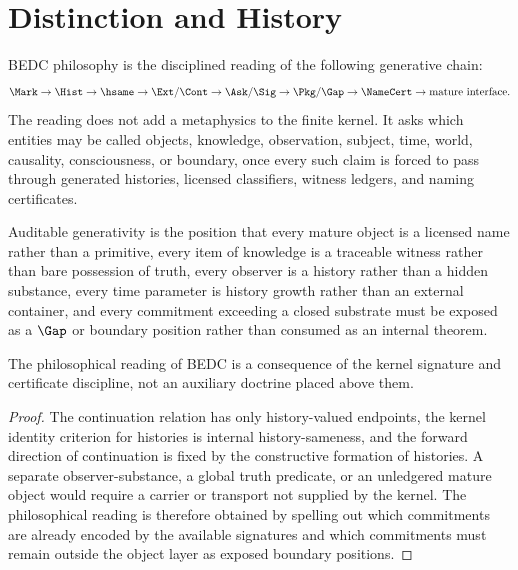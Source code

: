 \section{Distinction and History}
\label{sec:visions-philosophy-distinction-and-history}

BEDC philosophy is the disciplined reading of the following generative
chain:
$$
\begin{gathered}
\Mark \to \Hist \to \hsame \to \Ext/\Cont \to
\Ask/\Sig \to \Pkg/\Gap \to \NameCert \to
\text{mature interface}.
\end{gathered}
$$
The reading does not add a metaphysics to the finite kernel. It asks
which entities may be called objects, knowledge, observation, subject,
time, world, causality, consciousness, or boundary, once every such
claim is forced to pass through generated histories, licensed
classifiers, witness ledgers, and naming certificates.

\begin{definition}
\label{def:philosophy-auditable-generativity}
Auditable generativity is the position that every mature object is a
licensed name rather than a primitive, every item of knowledge is a
traceable witness rather than bare possession of truth, every observer
is a history rather than a hidden substance, every time parameter is
history growth rather than an external container, and every commitment
exceeding a closed substrate must be exposed as a \(\Gap\) or boundary
position rather than consumed as an internal theorem.
\end{definition}

\begin{theorem}
\label{thm:philosophy-not-additional-layer}
The philosophical reading of BEDC is a consequence of the kernel
signature and certificate discipline, not an auxiliary doctrine placed
above them.
\end{theorem}
\begin{proof}
The continuation relation has only history-valued endpoints, the kernel
identity criterion for histories is internal history-sameness, and the
forward direction of continuation is fixed by the constructive
formation of histories. A separate observer-substance, a global truth
predicate, or an unledgered mature object would require a carrier or
transport not supplied by the kernel. The philosophical reading is
therefore obtained by spelling out which commitments are already
encoded by the available signatures and which commitments must remain
outside the object layer as exposed boundary positions.
\end{proof}

